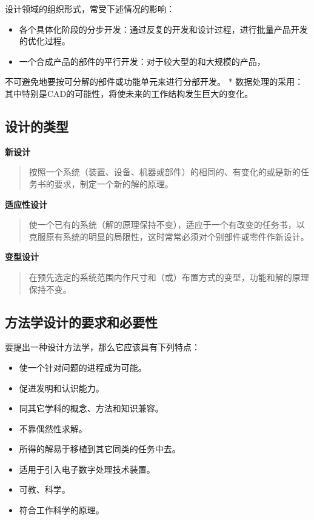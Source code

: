 \documentclass[letterpaper,10pt,english]{sphinxmanual}
\begin{document}
设计领域的组织形式，常受下述情况的影响：
\begin{itemize}
\item {} 
各个具体化阶段的分步开发：通过反复的开发和设计过程，进行批量产品开发的优化过程。

\item {} 
一个合成产品的部件的平行开发：对于较大型的和大规模的产品，

\end{itemize}

不可避免地要按可分解的部件或功能单元来进行分部开发。
* 数据处理的采用：其中特别是CAD的可能性，将使未来的工作结构发生巨大的变化。


\subsection{设计的类型}
\label{unit1:id4}
\textbf{新设计}
\begin{quote}

按照一个系统（装置、设备、机器或部件）的相同的、有变化的或是新的任务书的要求，制定一个新的解的原理。
\end{quote}

\textbf{适应性设计}
\begin{quote}

使一个已有的系统（解的原理保持不变），适应于一个有改变的任务书，以克服原有系统的明显的局限性，这时常常必须对个别部件或零件作新设计。
\end{quote}

\textbf{变型设计}
\begin{quote}

在预先选定的系统范围内作尺寸和（或）布置方式的变型，功能和解的原理保持不变。
\end{quote}


\subsection{方法学设计的要求和必要性}
\label{unit1:id5}
要提出一种设计方法学，那么它应该具有下列特点：
\begin{itemize}
\item {} 
使一个针对问题的进程成为可能。

\item {} 
促进发明和认识能力。

\item {} 
同其它学科的概念、方法和知识兼容。

\item {} 
不靠偶然性求解。

\item {} 
所得的解易于移植到其它同类的任务中去。

\item {} 
适用于引入电子数字处理技术装置。

\item {} 
可教、科学。

\item {} 
符合工作科学的原理。

\end{itemize}
\end{document}
